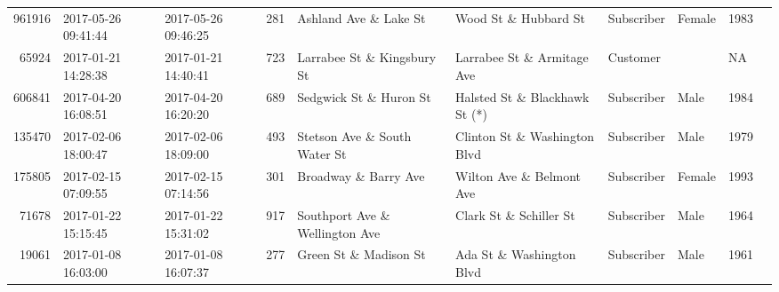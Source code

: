 \documentclass[11pt]{article}
\begin{document}
\begin{description}
\begin{tabular}{r|lllllllll}
	  961916                                & 2017-05-26 09:41:44                    & 2017-05-26 09:46:25                    &  281                                   & Ashland Ave \& Lake St                & Wood St \& Hubbard St                 & Subscriber                             & Female                                 & 1983                                  \\
	   65924                                & 2017-01-21 14:28:38                    & 2017-01-21 14:40:41                    &  723                                   & Larrabee St \& Kingsbury St           & Larrabee St \& Armitage Ave           & Customer                               &                                        &   NA                                  \\
	  606841                                & 2017-04-20 16:08:51                    & 2017-04-20 16:20:20                    &  689                                   & Sedgwick St \& Huron St               & Halsted St \& Blackhawk St (*)        & Subscriber                             & Male                                   & 1984                                  \\
	  135470                                & 2017-02-06 18:00:47                    & 2017-02-06 18:09:00                    &  493                                   & Stetson Ave \& South Water St         & Clinton St \& Washington Blvd         & Subscriber                             & Male                                   & 1979                                  \\
	  175805                                & 2017-02-15 07:09:55                    & 2017-02-15 07:14:56                    &  301                                   & Broadway \& Barry Ave                 & Wilton Ave \& Belmont Ave             & Subscriber                             & Female                                 & 1993                                  \\
	   71678                                & 2017-01-22 15:15:45                    & 2017-01-22 15:31:02                    &  917                                   & Southport Ave \& Wellington Ave       & Clark St \& Schiller St               & Subscriber                             & Male                                   & 1964                                  \\
	   19061                                & 2017-01-08 16:03:00                    & 2017-01-08 16:07:37                    &  277                                   & Green St \& Madison St                & Ada St \& Washington Blvd             & Subscriber                             & Male                                   & 1961                                  \\

\end{tabular}
\end{description}
\end{document}
